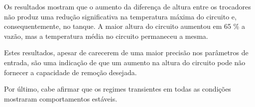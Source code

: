 \documentclass[a4paper,portuguese,10pt]{article}
\begin{document}
Os resultados mostram que o aumento da diferença de altura entre os trocadores não produz uma redução significativa na temperatura máxima do circuito e, consequentemente, no tanque. A maior altura do circuito aumentou em 65 \% a vazão, mas a temperatura média no circuito permaneceu a mesma. 

Estes resultados, apesar de carecerem de uma maior precisão nos parâmetros de entrada, são uma indicação de que um aumento na altura do circuito pode não fornecer a capacidade de remoção desejada.

Por último, cabe afirmar que os regimes transientes em todas as condições mostraram comportamentos estáveis.

\singlespacing




\end{document}
